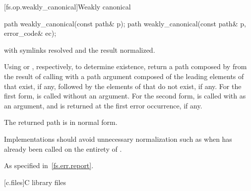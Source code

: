 [fs.op.weakly_canonical]{Weakly canonical}

%
\begin{itemdecl}
path weakly_canonical(const path& p);
path weakly_canonical(const path& p, error_code& ec);
\end{itemdecl}

\begin{itemdescr}
\pnum
\returns {} with symlinks resolved and
  the result normalized.

\pnum
\effects Using  or , respectively,
  to determine existence,
  return a path composed by 
  from the result of calling 
  with a path argument composed of
  the leading elements of  that exist, if any, followed by
  the elements of  that do not exist, if any.
  For the first form,
   is called without an  argument.
  For the second form,
   is called
  with  as an  argument, and
   is returned at the first error occurrence, if any.

\pnum
\ensures The returned path is in normal form.

\pnum
\remarks Implementations should
  avoid unnecessary normalization such as
  when  has already been called on the entirety of .

\pnum
\throws As specified in~\ref{fs.err.report}.
\end{itemdescr}

[c.files]{C library files}

